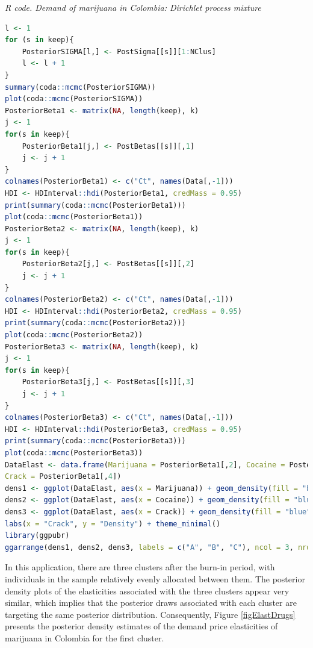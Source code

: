 \begin{tcolorbox}[enhanced,width=4.67in,center upper,
	fontupper=\large\bfseries,drop shadow southwest,sharp corners]
	\textit{R code. Demand of marijuana in Colombia: Dirichlet process mixture}
	\begin{VF}
		\begin{lstlisting}[language=R]
l <- 1
for (s in keep){
	PosteriorSIGMA[l,] <- PostSigma[[s]][1:NClus]
	l <- l + 1
}
summary(coda::mcmc(PosteriorSIGMA))
plot(coda::mcmc(PosteriorSIGMA))
PosteriorBeta1 <- matrix(NA, length(keep), k)
j <- 1
for(s in keep){
	PosteriorBeta1[j,] <- PostBetas[[s]][,1]
	j <- j + 1
}
colnames(PosteriorBeta1) <- c("Ct", names(Data[,-1]))
HDI <- HDInterval::hdi(PosteriorBeta1, credMass = 0.95)
print(summary(coda::mcmc(PosteriorBeta1)))
plot(coda::mcmc(PosteriorBeta1))
PosteriorBeta2 <- matrix(NA, length(keep), k)
j <- 1
for(s in keep){
	PosteriorBeta2[j,] <- PostBetas[[s]][,2]
	j <- j + 1
}
colnames(PosteriorBeta2) <- c("Ct", names(Data[,-1]))
HDI <- HDInterval::hdi(PosteriorBeta2, credMass = 0.95)
print(summary(coda::mcmc(PosteriorBeta2)))
plot(coda::mcmc(PosteriorBeta2))
PosteriorBeta3 <- matrix(NA, length(keep), k)
j <- 1
for(s in keep){
	PosteriorBeta3[j,] <- PostBetas[[s]][,3]
	j <- j + 1
}
colnames(PosteriorBeta3) <- c("Ct", names(Data[,-1]))
HDI <- HDInterval::hdi(PosteriorBeta3, credMass = 0.95)
print(summary(coda::mcmc(PosteriorBeta3)))
plot(coda::mcmc(PosteriorBeta3))
DataElast <- data.frame(Marijuana = PosteriorBeta1[,2], Cocaine = PosteriorBeta1[,3],
Crack = PosteriorBeta1[,4]) 
dens1 <- ggplot(DataElast, aes(x = Marijuana)) + geom_density(fill = "blue", alpha = 0.3) + labs(x = "Marijuana", y = "Density") + theme_minimal()
dens2 <- ggplot(DataElast, aes(x = Cocaine)) + geom_density(fill = "blue", alpha = 0.3) +  labs(x = "Cocaine", y = "Density") + theme_minimal()
dens3 <- ggplot(DataElast, aes(x = Crack)) + geom_density(fill = "blue", alpha = 0.3) + 
labs(x = "Crack", y = "Density") + theme_minimal()
library(ggpubr)
ggarrange(dens1, dens2, dens3, labels = c("A", "B", "C"), ncol = 3, nrow = 1, legend = "bottom", common.legend = TRUE)
\end{lstlisting}
	\end{VF}
\end{tcolorbox}

In this application, there are three clusters after the burn-in period, with individuals in the sample relatively evenly allocated between them. The posterior density plots of the elasticities associated with the three clusters appear very similar, which implies that the posterior draws associated with each cluster are targeting the same posterior distribution. Consequently, Figure \ref{figElastDrugs} presents the posterior density estimates of the demand price elasticities of marijuana in Colombia for the first cluster.

